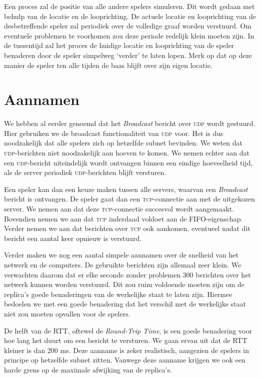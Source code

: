 \documentclass[a4paper,11pt, twoside]{article}
\newcommand{\udp}{\textsc{udp}\xspace}
\newcommand{\tcp}{\textsc{tcp}\xspace}
\begin{document}
    Een proces zal de positie van alle andere spelers simuleren. Dit wordt gedaan met behulp van de locatie en de looprichting. De actuele locatie en looprichting van de desbetreffende speler zal periodiek over de volledige graaf worden verstuurd. Om eventuele problemen te voorkomen zou deze periode redelijk klein moeten zijn. In de tussentijd zal het proces de huidige locatie en looprichting van de speler benaderen door de speler simpelweg `verder' te laten lopen. Merk op dat op deze manier de speler ten alle tijden de baas blijft over zijn eigen locatie.

    \section{Aannamen}
    We hebben al eerder genoemd dat het \emph{Broadcast} bericht over \udp wordt gestuurd. Hier gebruiken we de broadcast functionaliteit van \udp voor. Het is dus noodzakelijk dat alle spelers zich op hetzelfde subnet bevinden. We weten dat \udp-berichten niet noodzakelijk aan hoeven te komen. We nemen echter aan dat een \udp-bericht uiteindelijk wordt ontvangen binnen een eindige hoeveelheid tijd, als de server periodiek \udp-berichten blijft versturen.

    Een speler kan dan een keuze maken tussen alle servers, waarvan een \emph{Broadcast} bericht is ontvangen. De speler gaat dan een \tcp-connectie aan met de uitgekozen server. We nemen aan dat deze \tcp-connectie succesvol wordt aangemaakt. Bovendien nemen we aan dat \tcp inderdaad voldoet aan de FIFO-eigenschap. Verder nemen we aan dat berichten over \tcp ook aankomen, eventueel nadat dit bericht een aantal keer opnieuw is verstuurd.

    Verder maken we nog een aantal simpele aannamen over de snelheid van het netwerk en de computers. De gebruikte berichten zijn allemaal zeer klein. We verwachten daarom dat er elke seconde zonder problemen 300 berichten over het netwerk kunnen worden verstuurd. Dit zou ruim voldoende moeten zijn om de replica's goede benaderingen van de werkelijke staat te laten zijn. Hiermee bedoelen we met een goede benadering dat het verschil met de werkelijke staat niet zou moeten opvallen voor de spelers.

    De helft van de RTT, oftewel de \emph{Round-Trip Time}, is een goede benadering voor hoe lang het duurt om een bericht te versturen. We gaan ervan uit dat de RTT kleiner is dan 200 ms. Deze aanname is zeker realistisch, aangezien de spelers in principe op hetzelfde subnet zitten. Vanwege deze aanname krijgen we ook een harde grens op de maximale afwijking van de replica's.
\end{document}

